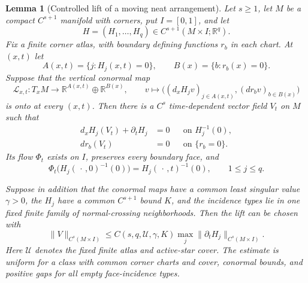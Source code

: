 \documentclass[11pt]{amsart}
\numberwithin{equation}{section}
\newtheorem{lemma}[theorem]{Lemma}
\theoremstyle{definition}
\theoremstyle{remark}
\begin{document}
\begin{lemma}[Controlled lift of a moving neat arrangement]
\label{lem:controlled-neat-lift}
Let $s\ge1$, let $M$ be a compact $C^{s+1}$ manifold with corners, put
$I=[0,1]$, and let
\[
 H=(H_1,\ldots,H_q)\in C^{s+1}(M\times I;\mathbb R^q).
\]
Fix a finite corner atlas, with boundary defining functions $r_b$ in
each chart.  At $(x,t)$ let
\[
 A(x,t)=\{j:H_j(x,t)=0\},\qquad
 B(x)=\{b:r_b(x)=0\}.
\]
Suppose that the vertical conormal map
\begin{equation}\label{eq:controlled-lift-conormal-map}
 \mathcal L_{x,t}:T_xM\longrightarrow
 \mathbb R^{A(x,t)}\oplus\mathbb R^{B(x)},\qquad
 v\longmapsto
 \bigl((d_xH_jv)_{j\in A(x,t)},(dr_bv)_{b\in B(x)}\bigr)
\end{equation}
is onto at every $(x,t)$.  Then there is a $C^s$ time-dependent vector
field $V_t$ on $M$ such that
\begin{align}
 d_xH_j(V_t)+\partial_tH_j&=0
       &&\text{on }H_j^{-1}(0),
 \label{eq:controlled-lift-H}\\
 dr_b(V_t)&=0
       &&\text{on }\{r_b=0\}.
 \label{eq:controlled-lift-boundary}
\end{align}
Its flow $\Phi_t$ exists on $I$, preserves every boundary face, and
\begin{equation}\label{eq:controlled-lift-zero-sets}
 \Phi_t\bigl(H_j(\,\cdot\,,0)^{-1}(0)\bigr)
 =H_j(\,\cdot\,,t)^{-1}(0),\qquad 1\le j\le q.
\end{equation}

Suppose in addition that the conormal maps have a common least singular
value $\gamma>0$, the $H_j$ have a common $C^{s+1}$ bound $K$, and the
incidence types lie in one fixed finite family of normal-crossing
neighborhoods.  Then the lift can be chosen with
\begin{equation}\label{eq:controlled-lift-estimate}
 \|V\|_{C^s(M\times I)}
 \le C(s,q,\mathcal U,\gamma,K)\max_j
       \|\partial_tH_j\|_{C^s(M\times I)}.
\end{equation}
Here $\mathcal U$ denotes the fixed finite atlas and active-star cover.
The estimate is uniform for a class with common corner charts and cover,
conormal bounds, and positive gaps for all empty face-incidence types.
\end{lemma}
\end{document}
